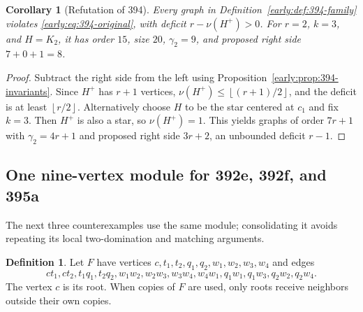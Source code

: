 \documentclass[11pt,a4paper]{article}
\newtheorem{corollary}[theorem]{Corollary}
\theoremstyle{definition}\newtheorem{definition}[theorem]{Definition}
\theoremstyle{remark}\newtheorem{remark}[theorem]{Remark}
\newcommand{\floor}[1]{\left\lfloor#1\right\rfloor}
\begin{document}
\begin{corollary}[Refutation of 394]
\label{early:cor:394}
Every graph in Definition~\ref{early:def:394-family} violates
\eqref{early:eq:394-original}, with deficit $r-\nu(H^+)>0$.
For $r=2$, $k=3$, and $H=K_2$, it has order $15$, size $20$,
$\gamma_2=9$, and proposed right side $7+0+1=8$.
\end{corollary}
\begin{proof}
Subtract the right side from the left using
Proposition~\ref{early:prop:394-invariants}.  Since $H^+$ has $r+1$
vertices, $\nu(H^+)\leq\floor{(r+1)/2}$, and the deficit is at least
$\floor{r/2}$.  Alternatively choose $H$ to be the star centered at
$c_1$ and fix $k=3$.  Then $H^+$ is also a star, so
$\nu(H^+)=1$.  This yields graphs of order $7r+1$ with
$\gamma_2=4r+1$ and proposed right side $3r+2$, an unbounded deficit
$r-1$.
\end{proof}

\subsection{One nine-vertex module for 392e, 392f, and 395a}

The next three counterexamples use the same module; consolidating it
avoids repeating its local two-domination and matching arguments.

\begin{definition}
\label{early:def:nine-module}
Let $F$ have vertices $c,t_1,t_2,q_1,q_2,w_1,w_2,w_3,w_4$ and edges
\[
 ct_1,ct_2,t_1q_1,t_2q_2,
 w_1w_2,w_2w_3,w_3w_4,w_4w_1,
 q_1w_1,q_1w_3,q_2w_2,q_2w_4.
\]
The vertex $c$ is its root.  When copies of $F$ are used, only roots
receive neighbors outside their own copies.
\end{definition}
\end{document}
